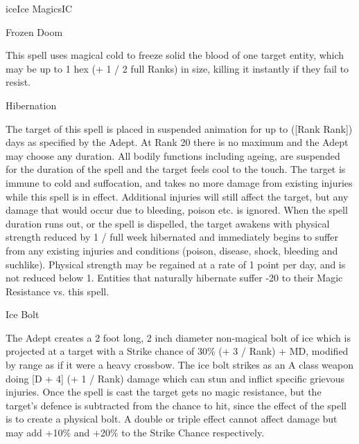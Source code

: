 \begin{college}[1.5]{ice}{Ice Magics}{IC}
\begin{spell}[S-5]{Frozen Doom}
\begin{effects}
This spell uses magical cold to freeze solid the blood of one target
entity, which may be up to 1 hex (+ 1 / 2 full Ranks) in size, killing
it instantly if they fail to resist.
\end{effects}
\end{spell}

\begin{spell}[S-6]{Hibernation}

\begin{effects}
The target of this spell is placed in suspended animation for up to
([Rank \x Rank]) days as specified by the Adept.  At Rank 20 there is
no maximum and the Adept may choose any duration.  All bodily
functions including ageing, are suspended for the duration of the
spell and the target feels cool to the touch. The target is immune to
cold and suffocation, and takes no more damage from existing injuries
while this spell is in effect.  Additional injuries will still affect
the target, but any damage that would occur due to bleeding, poison
etc. is ignored. When the spell duration runs out, or the spell is
dispelled, the target awakens with physical strength reduced by 1 /
full week hibernated and immediately begins to suffer from any
existing injuries and conditions (poison, disease, shock, bleeding and
suchlike). Physical strength may be regained at a rate of 1 point per
day, and is not reduced below 1. Entities that naturally hibernate
suffer -20 to their Magic Resistance vs. this spell.
\end{effects}
\end{spell}

\begin{spell}[S-7]{Ice Bolt}

\begin{effects}
The Adept creates a 2 foot long, 2 inch diameter non-magical bolt of
ice which is projected at a target with a Strike chance of 30\% (+ 3 /
Rank) + MD, modified by range as if it were a heavy crossbow. The ice
bolt strikes as an A class weapon doing [D + 4] (+ 1 / Rank) damage
which can stun and inflict specific grievous injuries. Once the spell
is cast the target gets no magic resistance, but the target's defence
is subtracted from the chance to hit, since the effect of the spell is
to create a physical bolt.  A double or triple effect cannot affect
damage but may add +10\% and +20\% to the Strike Chance respectively.
\end{effects}
\end{spell}


\end{college}
